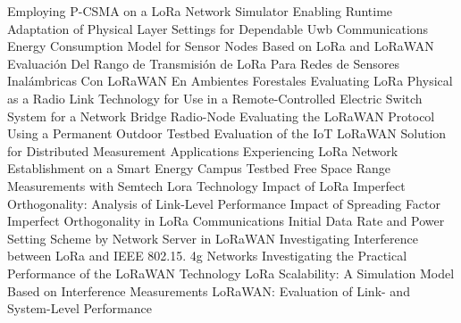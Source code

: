  \cite{kouvelas_employing_2018} Employing P-{{CSMA}} on a {{LoRa Network Simulator}} \newline 
 \cite{gros_swindhager_enabling_2018} Enabling Runtime Adaptation of Physical Layer Settings for Dependable Uwb Communications \newline 
 \cite{bouguera_energy_2018} Energy Consumption Model for Sensor Nodes Based on {{LoRa}} and {{LoRaWAN}} \newline 
 \cite{avilacampos_evaluacion_2017} Evaluación Del Rango de Transmisión de {{LoRa}} Para Redes de Sensores Inalámbricas Con {{LoRaWAN}} En Ambientes Forestales \newline 
 \cite{adenhassan_evaluating_2019} Evaluating {{LoRa Physical}} as a {{Radio Link Technology}} for Use in a {{Remote}}-{{Controlled Electric Switch System}} for a {{Network Bridge Radio}}-{{Node}} \newline 
 \cite{marais_evaluating_2019} Evaluating the {{LoRaWAN Protocol Using}} a {{Permanent Outdoor Testbed}} \newline 
 \cite{rizzi_evaluation_2017} Evaluation of the {{IoT LoRaWAN Solution}} for {{Distributed Measurement Applications}} \newline 
 \cite{kim_experiencing_2019} Experiencing {{LoRa Network Establishment}} on a {{Smart Energy Campus Testbed}} \newline 
 \cite{aref_free_2014} Free Space Range Measurements with {{Semtech Lora}} Technology \newline 
 \cite{croce_impact_2018} Impact of {{LoRa Imperfect Orthogonality}}: {{Analysis}} of {{Link}}-{{Level Performance}} \newline 
 \cite{croce_impact_2017} Impact of {{Spreading Factor Imperfect Orthogonality}} in {{LoRa Communications}} \newline 
 \cite{chinchin_initial_2018} Initial {{Data Rate}} and {{Power Setting Scheme}} by {{Network Server}} in {{LoRaWAN}} \newline 
 \cite{orfanidis_investigating_2017} Investigating Interference between {{LoRa}} and {{IEEE}} 802.15. 4g Networks \newline 
 \cite{skog_andersen_investigating_2017} Investigating the Practical Performance of the {{LoRaWAN}} Technology \newline 
 \cite{jetmir_haxhibeqiri_lora_2017} {{LoRa Scalability}}: {{A Simulation Model Based}} on {{Interference Measurements}} \newline 
 \cite{feltrin_lorawan_2018} {{LoRaWAN}}: {{Evaluation}} of {{Link}}- and {{System}}-{{Level Performance}} \newline 
